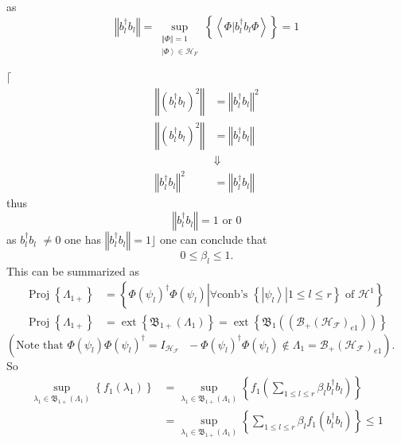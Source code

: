 \documentclass[aps,preprint]{revtex4}%
\begin{document}
as
\begin{equation}
\left\Vert b_{l}^{\dagger}b_{l}\right\Vert =\sup_{\substack{\left\Vert
\Phi\right\Vert =1\\\left\vert \Phi\right\rangle \in\mathcal{H}_{F}}}\left\{
\left\langle \left.  \Phi\right\vert b_{l}^{\dagger}b_{l}\Phi\right\rangle
\right\}  =1
\end{equation}


$\lceil$%
\begin{align}
\left\Vert \left(  b_{l}^{\dagger}b_{l}\right)  ^{2}\right\Vert  &
=\left\Vert b_{l}^{\dagger}b_{l}\right\Vert ^{2}\nonumber\\
\left\Vert \left(  b_{l}^{\dagger}b_{l}\right)  ^{2}\right\Vert  &
=\left\Vert b_{l}^{\dagger}b_{l}\right\Vert \nonumber\\
&  \Downarrow\nonumber\\
\left\Vert b_{l}^{\dagger}b_{l}\right\Vert ^{2}  &  =\left\Vert b_{l}%
^{\dagger}b_{l}\right\Vert
\end{align}
thus
\begin{equation}
\left\Vert b_{l}^{\dagger}b_{l}\right\Vert =1\text{ or }0
\end{equation}
as $b_{l}^{\dagger}b_{l}$ $\neq0$ one has $\left\Vert b_{l}^{\dagger}%
b_{l}\right\Vert =1\rfloor$ one can conclude that
\begin{equation}
0\leq\beta_{l}\leq1.
\end{equation}
This can be summarized as%
\begin{align}
\operatorname*{Proj}\left\{  \Lambda_{1+}\right\}   &  =\left\{  \left.
\Phi\left(  \psi_{l}\right)  ^{\dagger}\Phi\left(  \psi_{l}\right)
\right\vert \forall\text{conb's }\left\{  \left.  \left\vert \psi
_{l}\right\rangle \right\vert 1\leq l\leq r\right\}  \text{ of }%
\mathcal{H}^{1}\right\} \nonumber\\
\operatorname*{Proj}\left\{  \Lambda_{1+}\right\}   &  =\operatorname*{ext}%
\left\{  \mathfrak{B}_{1+}\left(  \Lambda_{1}\right)  \right\}
=\operatorname*{ext}\left\{  \mathfrak{B}_{1}\left(  \left(  \mathcal{B}%
_{+}\left(  \mathcal{H}_{\mathcal{F}}\right)  _{e1}\right)  \right)  \right\}
\end{align}
$\left(  \text{Note that }\Phi\left(  \psi_{l}\right)  \Phi\left(  \psi
_{l}\right)  ^{\dagger}=I_{\mathcal{H}_{\mathcal{F}}}\text{ }-\Phi\left(
\psi_{l}\right)  ^{\dagger}\Phi\left(  \psi_{l}\right)  \notin\Lambda
_{1}=\mathcal{B}_{+}\left(  \mathcal{H}_{\mathcal{F}}\right)  _{e1}\right)  .$
So
\begin{align}
\sup_{\lambda_{1}\in\mathfrak{B}_{1+}\left(  \Lambda_{1}\right)  }\left\{
f_{1}\left(  \lambda_{1}\right)  \right\}   &  =\sup_{\lambda_{1}%
\in\mathfrak{B}_{1+}\left(  \Lambda_{1}\right)  }\left\{  f_{1}\left(
\sum_{1\leq l\leq r}\beta_{l}b_{l}^{\dagger}b_{l}\right)  \right\} \nonumber\\
&  =\sup_{\lambda_{1}\in\mathfrak{B}_{1+}\left(  \Lambda_{1}\right)  }\left\{
\sum_{1\leq l\leq r}\beta_{l}f_{1}\left(  b_{l}^{\dagger}b_{l}\right)
\right\}  \leq1
\end{align}
\end{document}
